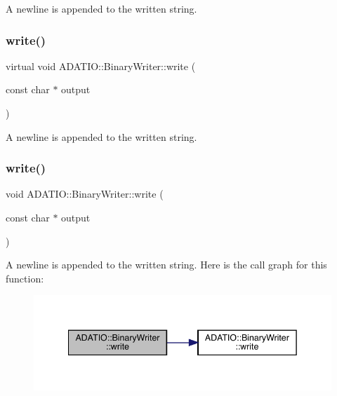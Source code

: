 A newline is appended to the written string. \mbox{\label{classADATIO_1_1BinaryWriter_add59d41e33f9b8c1ef59247c8bf59084}} 
\subsubsection{\texorpdfstring{write()}{write()}\hspace{0.1cm}{\footnotesize\ttfamily [4/36]}}
{\footnotesize\ttfamily virtual void A\+D\+A\+T\+I\+O\+::\+Binary\+Writer\+::write (\begin{DoxyParamCaption}\item[{const char $\ast$}]{output }\end{DoxyParamCaption})\hspace{0.3cm}{\ttfamily [virtual]}}

A newline is appended to the written string. \mbox{\label{classADATIO_1_1BinaryWriter_a124ca67335cb24b5da69258dcd330b50}} 
\subsubsection{\texorpdfstring{write()}{write()}\hspace{0.1cm}{\footnotesize\ttfamily [5/36]}}
{\footnotesize\ttfamily void A\+D\+A\+T\+I\+O\+::\+Binary\+Writer\+::write (\begin{DoxyParamCaption}\item[{const char $\ast$}]{output }\end{DoxyParamCaption})\hspace{0.3cm}{\ttfamily [virtual]}}

A newline is appended to the written string. Here is the call graph for this function\+:
\nopagebreak
\begin{figure}[H]
\begin{center}
\leavevmode
\includegraphics[width=342pt]{db/dee/classADATIO_1_1BinaryWriter_a124ca67335cb24b5da69258dcd330b50_cgraph}
\end{center}
\end{figure}
\mbox{\label{classADATIO_1_1BinaryWriter_add59d41e33f9b8c1ef59247c8bf59084}} 
